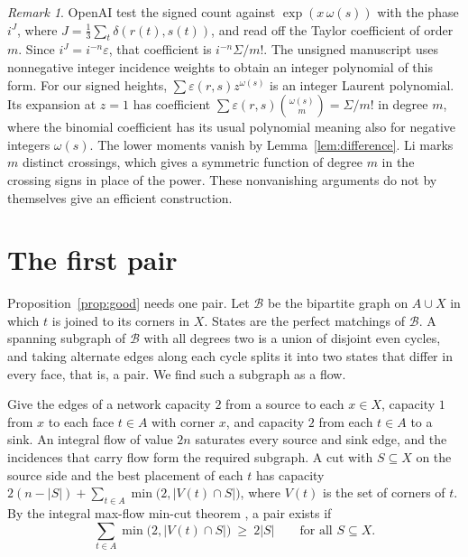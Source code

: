 \documentclass[10pt]{amsart}
\numberwithin{equation}{section}
\theoremstyle{definition}
\theoremstyle{remark}
\newtheorem{remark}[equation]{Remark}
\newcommand{\eps}{\varepsilon}
\begin{document}
\begin{remark}\label{rem:other-sums}
OpenAI test the signed count against $\exp(x\,\omega(s))$ with the phase $i^{J}$, where $J=\frac13\sum_t\delta(r(t),s(t))$, and read off the Taylor coefficient of order $m$.
Since $i^{J}=i^{-n}\eps$, that coefficient is $i^{-n}\Sigma/m!$.
The unsigned manuscript \cite{Anonymous2026} uses nonnegative integer incidence weights to obtain an integer polynomial of this form.
For our signed heights, $\sum\eps(r,s)z^{\omega(s)}$ is an integer Laurent polynomial.
Its expansion at $z=1$ has coefficient $\sum\eps(r,s)\binom{\omega(s)}{m}=\Sigma/m!$ in degree $m$, where the binomial coefficient has its usual polynomial meaning also for negative integers $\omega(s)$. The lower moments vanish by Lemma~\ref{lem:difference}.
Li \cite{Li2026} marks $m$ distinct crossings, which gives a symmetric function of degree $m$ in the crossing signs in place of the power.
These nonvanishing arguments do not by themselves give an efficient construction.
\end{remark}

\section{The first pair}\label{sec:flow}

Proposition~\ref{prop:good} needs one pair.
Let $\mathcal{B}$ be the bipartite graph on $A\cup X$ in which $t$ is joined to its corners in $X$.
States are the perfect matchings of $\mathcal{B}$.
A spanning subgraph of $\mathcal{B}$ with all degrees two is a union of disjoint even cycles, and taking alternate edges along each cycle splits it into two states that differ in every face, that is, a pair.
We find such a subgraph as a flow.

Give the edges of a network capacity $2$ from a source to each $x\in X$, capacity $1$ from $x$ to each face $t\in A$ with corner $x$, and capacity $2$ from each $t\in A$ to a sink.
An integral flow of value $2n$ saturates every source and sink edge, and the incidences that carry flow form the required subgraph.
A cut with $S\subseteq X$ on the source side and the best placement of each $t$ has capacity $2(n-|S|)+\sum_{t\in A}\min\bigl(2,|V(t)\cap S|\bigr)$, where $V(t)$ is the set of corners of $t$.
By the integral max-flow min-cut theorem \cite{Ford1956}, a pair exists if
\begin{equation}\label{eq:hall}
\sum_{t\in A}\min\bigl(2,|V(t)\cap S|\bigr)\ \ge\ 2|S|\qquad\text{for all } S\subseteq X .
\end{equation}
\end{document}
